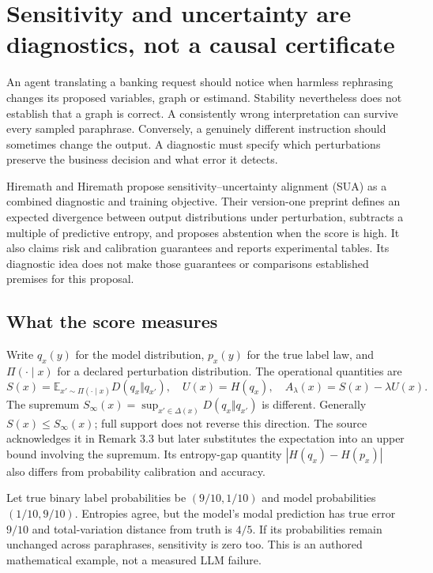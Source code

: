 
\section{Sensitivity and uncertainty are diagnostics, not a causal certificate}
\label{sec:exec23-sua-review}
An agent translating a banking request should notice when harmless rephrasing
changes its proposed variables, graph or estimand. Stability nevertheless does
not establish that a graph is correct. A consistently wrong interpretation can
survive every sampled paraphrase. Conversely, a genuinely different instruction
should sometimes change the output. A diagnostic must specify which
perturbations preserve the business decision and what error it detects.

Hiremath and Hiremath propose sensitivity--uncertainty alignment (SUA) as a
combined diagnostic and training objective. Their version-one preprint defines
an expected divergence between output distributions under perturbation,
subtracts a multiple of predictive entropy, and proposes abstention when the
score is high. It also claims risk and calibration guarantees and reports
experimental tables. Its diagnostic idea does not make those guarantees or
comparisons established premises for this proposal. \citep{exec23_sua_original}

\subsection{What the score measures}
Write $q_x(y)$ for the model distribution, $p_x(y)$ for the true label law,
and $\Pi(\cdot\mid x)$ for a declared perturbation distribution. The
operational quantities are
\[
 S(x)=\mathbb E_{x'\sim\Pi(\cdot\mid x)}D(q_x\Vert q_{x'}),
 \quad U(x)=H(q_x),\quad A_\lambda(x)=S(x)-\lambda U(x).
\]
The supremum $S_\infty(x)=\sup_{x'\in\Delta(x)}D(q_x\Vert q_{x'})$
is different. Generally $S(x)\leq S_\infty(x)$; full support does not reverse
this direction. The source acknowledges it in Remark 3.3 but later substitutes
the expectation into an upper bound involving the supremum. Its entropy-gap
quantity $|H(q_x)-H(p_x)|$ also differs from probability calibration and
accuracy. \citep{exec23_sua_original}

Let true binary label probabilities be $(9/10,1/10)$ and model probabilities
$(1/10,9/10)$. Entropies agree, but the model's modal prediction has true
error $9/10$ and total-variation distance from truth is $4/5$. If its
probabilities remain unchanged across paraphrases, sensitivity is zero too.
This is an authored mathematical example, not a measured LLM failure.
\citep{exec23_sua_counterexamples}

